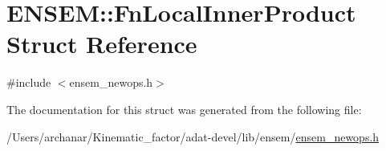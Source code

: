 \hypertarget{structENSEM_1_1FnLocalInnerProduct}{}\section{E\+N\+S\+EM\+:\+:Fn\+Local\+Inner\+Product Struct Reference}
\label{structENSEM_1_1FnLocalInnerProduct}


{\ttfamily \#include $<$ensem\+\_\+newops.\+h$>$}



The documentation for this struct was generated from the following file\+:\begin{DoxyCompactItemize}
\item 
/\+Users/archanar/\+Kinematic\+\_\+factor/adat-\/devel/lib/ensem/\mbox{\hyperlink{adat-devel_2lib_2ensem_2ensem__newops_8h}{ensem\+\_\+newops.\+h}}\end{DoxyCompactItemize}
